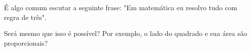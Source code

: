 
É algo comum escutar a seguinte frase: "Em matemática eu
resolvo tudo com regra de três".

Será mesmo que isso é possível? Por exemplo, o lado do
quadrado e sua área são proporcionais?